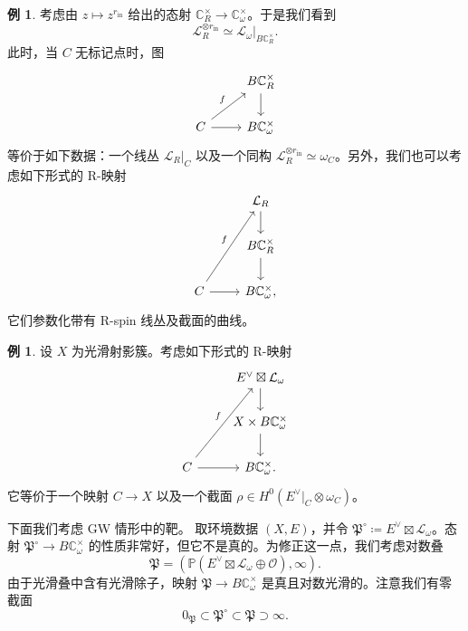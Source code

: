 \documentclass{amsart}
\theoremstyle{definition}
\newtheorem{exm}[thm]{例}
\theoremstyle{remark}
\theoremstyle{plain}
\theoremstyle{definition}
\theoremstyle{remark}
\newcommand{\C}{\mathbb{C}}
\renewcommand{\P}{\mathbb{P}}
\newcommand{\mc}[1]{\mathcal{#1}}
\newcommand{\mf}[1]{\mathfrak{#1}}
\newcommand{\mr}[1]{\mathrm{#1}}
\newcommand{\1}{\mathbf{1}}
\newcommand{\2}{\mathbf{2}}
\newcommand{\3}{\mathbf{3}}
\begin{document}
\begin{exm}
    考虑由 \(z \mapsto z^{r_{\mr{in}}}\) 给出的态射 \(\C^{\times}_R \to \C^{\times}_{\omega}\)。于是我们看到
    \[ \mc{L}_R^{\otimes r_{\mr{in}}} \simeq \mc{L}_{\omega} |_{B \C_R^{\times}}. \]
    此时，当 \(C\) 无标记点时，图
    \begin{equation*}
    \begin{tikzcd}
        & B \C_R^{\times} \ar{d} \\
        C \ar{ur}{f} \ar{r} & B \C_{\omega}^{\times}
    \end{tikzcd}
    \end{equation*}
    等价于如下数据：一个线丛 \(\mc{L}_R|_C\) 以及一个同构 \(\mc{L}_R^{\otimes r_{\mr{in}}} \simeq \omega_C\)。另外，我们也可以考虑如下形式的 R-映射
    \begin{equation*}
    \begin{tikzcd}
        & \mc{L}_R \ar{d} \\
        & B \C_R^{\times} \ar{d} \\
        C \ar{uur}{f} \ar{r} & B \C_{\omega}^{\times},
    \end{tikzcd}
    \end{equation*}
    它们参数化带有 R-spin 线丛及截面的曲线。
\end{exm}

\begin{exm}
    设 \(X\) 为光滑射影簇。考虑如下形式的 R-映射
    \begin{equation*}
    \begin{tikzcd}
        & E^{\vee} \boxtimes \mc{L}_{\omega} \ar{d} \\
        & X \times B \C_{\omega}^{\times} \ar{d} \\
        C \ar{uur}{f} \ar{r} & B \C_{\omega}^{\times}.
    \end{tikzcd}
    \end{equation*}
    它等价于一个映射 \(C \to X\) 以及一个截面 \(\rho \in H^0(E^{\vee}|_C \otimes \omega_C)\)。
\end{exm}

下面我们考虑 GW 情形中的靶。
取环境数据 \((X, E)\)，并令 \(\mf{P}^{\circ} \coloneqq E^{\vee} \boxtimes \mc{L}_{\omega}\)。态射 \(\mf{P}^{\circ} \to B \C_{\omega}^{\times}\) 的性质非常好，但它不是真的。为修正这一点，我们考虑对数叠
\[ \mf{P} = ( \P(E^{\vee} \boxtimes \mc{L}_{\omega} \oplus \mc{O}) , \infty). \]
由于光滑叠中含有光滑除子，映射 \(\mf{P} \to B \C_{\omega}^{\times}\) 是真且对数光滑的。注意我们有零截面
\[ 0_{\mf{P}} \subset \mf{P}^{\circ} \subset \mf{P} \supset \infty. \]
\end{document}
